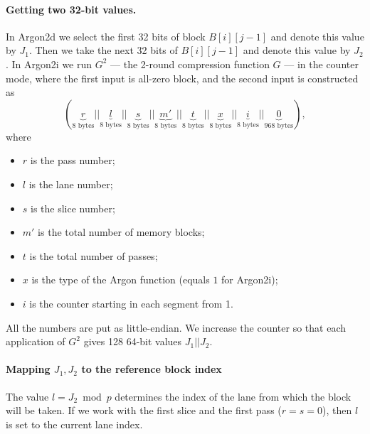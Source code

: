 \documentclass[a4paper]{article}
\begin{document}
\paragraph{Getting two 32-bit values.} In Argon2d we select  the first 32 bits of  block $B[i][j-1]$ and denote this value by $J_1$. Then we take the next 32 bits of $B[i][j-1]$ and denote this value by $J_2$. In \textsf{Argon2i} we run $G^2$ --- the 2-round compression function $G$ --- in the counter mode, where the first input is all-zero block, and the second input is constructed as 
  $$
  (\underbrace{r}_{\text{8 bytes}}||\underbrace{l}_{\text{8 bytes}}||\underbrace{s}_{\text{8 bytes}}||\underbrace{m'}_{\text{8 bytes}}||\underbrace{t}_{\text{8 bytes}}||\underbrace{x}_{\text{8 bytes}}||\underbrace{i}_{\text{8 bytes}}||\underbrace{0}_{\text{968 bytes}}),
  $$ where
  \begin{itemize}
  \item $r$ is the pass number;
  \item $l$ is the lane number;
  \item $s$ is the slice number;
  \item $m'$ is the total number of memory blocks;
  \item $t$ is the total number of passes;
  \item $x$ is the type of the Argon function (equals $1$ for \textsf{Argon2i});
  \item $i$ is  the counter starting in each segment from 1.
  \end{itemize} All the numbers are put as little-endian. We increase the counter so that each application of $G^2$ gives 128 64-bit values $J_1||J_2$.
  
 \paragraph{Mapping $J_1,J_2$ to the reference block index} The value $l = J_2 \bmod p$ determines the index of the lane from which the block will be taken. If we work with the first slice and the first pass ($r=s=0$), then $l$ is set to the current lane index.  
 
\end{document}
